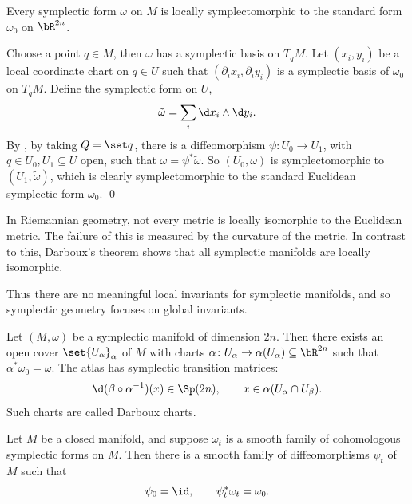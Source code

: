 \eproof

\bthrm[title={Darboux's}, name={darboux}]

    Every symplectic form $\omega$ on $M$ is locally symplectomorphic to the standard form $\omega_0$ on $\bR^{2n}$.

\ethrm

\bproof

    Choose a point $q\in M$, then $\omega$ has a symplectic basis on $T_qM$.
    Let $(x_i,y_i)$ be a local coordinate chart on $q\in U$ such that $(\partial_ix_i,\partial_iy_i)$ is a symplectic basis of $\omega_0$ on $T_qM$.
    Define the symplectic form on $U$,
    $$ \tilde\omega = \sum_i\d x_i\wedge\d y_i . $$
    By , by taking $Q=\set q$, there is a diffeomorphism $\psi\colon U_0\to U_1$, with $q\in U_0,U_1\subseteq U$ open, such that $\omega=\psi^*\tilde\omega$.
    So $(U_0,\omega)$ is symplectomorphic to $(U_1,\tilde\omega)$, which is clearly symplectomorphic to the standard Euclidean symplectic form $\omega_0$.
    \qed

\eproof

\bnote

    In Riemannian geometry, not every metric is locally isomorphic to the Euclidean metric.
    The failure of this is measured by the curvature of the metric.
    In contrast to this, Darboux's theorem shows that all symplectic manifolds are locally isomorphic.

    Thus there are no meaningful local invariants for symplectic manifolds, and so symplectic geometry focuses on global invariants.

\enote

\bcoro

    Let $(M,\omega)$ be a symplectic manifold of dimension $2n$.
    Then there exists an open cover $\set{U_\alpha}_\alpha$ of $M$ with charts $\alpha\colon U_\alpha\to\alpha(U_\alpha)\subseteq\bR^{2n}$
    such that $\alpha^*\omega_0=\omega$.
    The atlas has symplectic transition matrices:
    $$ \d(\beta\circ\alpha^{-1})(x) \in \Sp(2n),\qquad x\in\alpha(U_\alpha\cap U_\beta) . $$
    Such charts are called {\emphcolor Darboux charts}.

\ecoro

\bthrm[title={Moser stability}, name={moserstability}]

    Let $M$ be a closed manifold, and suppose $\omega_t$ is a smooth family of cohomologous symplectic forms on $M$.
    Then there is a smooth family of diffeomorphisms $\psi_t$ of $M$ such that
    $$ \psi_0 = \id,\qquad \psi_t^*\omega_t = \omega_0 . $$

